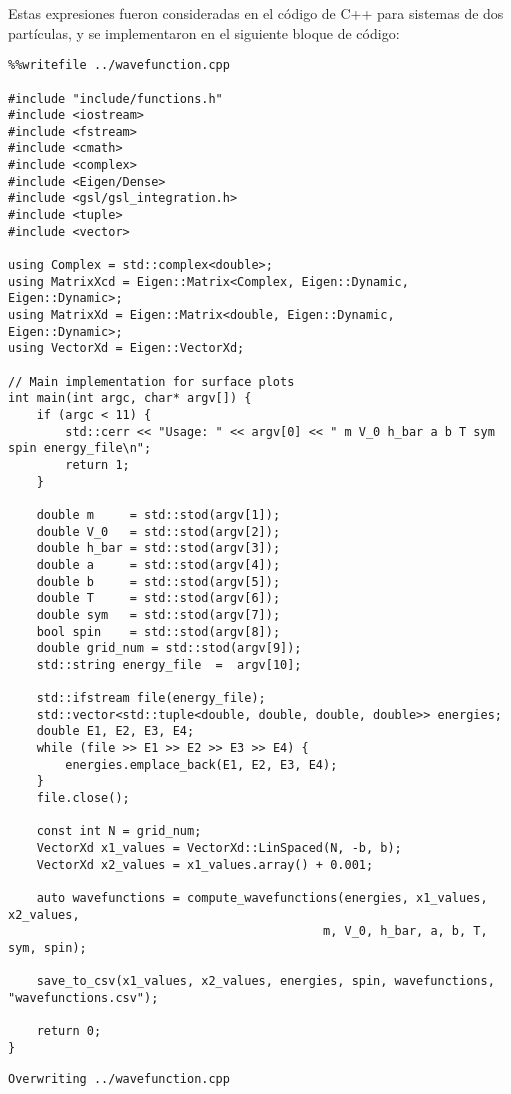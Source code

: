 \documentclass[11pt]{article}
\begin{document}
Estas expresiones fueron consideradas en el código de C++ para sistemas de dos
partículas, y se implementaron en el siguiente bloque de código:
\begin{verbatim}
%%writefile ../wavefunction.cpp

#include "include/functions.h"
#include <iostream>
#include <fstream>
#include <cmath>
#include <complex>
#include <Eigen/Dense>
#include <gsl/gsl_integration.h>
#include <tuple>
#include <vector>

using Complex = std::complex<double>;
using MatrixXcd = Eigen::Matrix<Complex, Eigen::Dynamic, Eigen::Dynamic>;
using MatrixXd = Eigen::Matrix<double, Eigen::Dynamic, Eigen::Dynamic>;
using VectorXd = Eigen::VectorXd;

// Main implementation for surface plots
int main(int argc, char* argv[]) {
    if (argc < 11) {
        std::cerr << "Usage: " << argv[0] << " m V_0 h_bar a b T sym spin energy_file\n";
        return 1;
    }

    double m     = std::stod(argv[1]);
    double V_0   = std::stod(argv[2]);
    double h_bar = std::stod(argv[3]);
    double a     = std::stod(argv[4]);
    double b     = std::stod(argv[5]);
    double T     = std::stod(argv[6]);
    double sym   = std::stod(argv[7]);
    bool spin    = std::stod(argv[8]);
    double grid_num = std::stod(argv[9]);
    std::string energy_file  =  argv[10];

    std::ifstream file(energy_file);
    std::vector<std::tuple<double, double, double, double>> energies;
    double E1, E2, E3, E4;
    while (file >> E1 >> E2 >> E3 >> E4) {
        energies.emplace_back(E1, E2, E3, E4);
    }
    file.close();

    const int N = grid_num;
    VectorXd x1_values = VectorXd::LinSpaced(N, -b, b);
    VectorXd x2_values = x1_values.array() + 0.001;

    auto wavefunctions = compute_wavefunctions(energies, x1_values, x2_values,
                                            m, V_0, h_bar, a, b, T, sym, spin);

    save_to_csv(x1_values, x2_values, energies, spin, wavefunctions, "wavefunctions.csv");

    return 0;
}
\end{verbatim}

\label{org5d00081}
\begin{verbatim}
Overwriting ../wavefunction.cpp
\end{verbatim}
\end{document}
